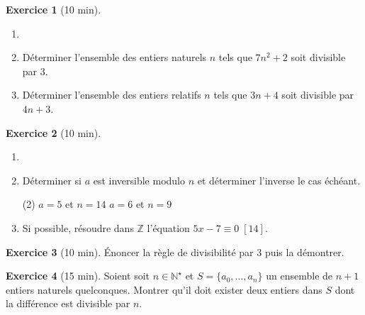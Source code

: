 \documentclass{exam}
\theoremstyle{definition}
\newtheorem{exercice}{Exercice}
\begin{document}
    \large





    \begin{exercice}[10 min]
        \begin{enumerate}
            \item[]
            \item Déterminer l’ensemble des entiers naturels $n$ tels que $7n^2 + 2$ soit divisible par $3$.
            \item Déterminer l’ensemble des entiers relatifs $n$ tels que $3n + 4$ soit divisible par $4n + 3$.
        \end{enumerate}
    \end{exercice}
    
    \begin{exercice}[10 min]
        \begin{enumerate}
            \item[]
            \item Déterminer si $a$ est inversible modulo $n$ et déterminer l’inverse le cas échéant.
            \begin{tasks}(2)
                \task $a = 5$ et $n = 14$
                \task $a = 6$ et $n = 9$
            \end{tasks}
            \item Si possible, résoudre dans $\mathbb{Z}$ l'équation $5x -7 \equiv 0 \; [14]$.
        \end{enumerate}
    \end{exercice}
    
    \begin{exercice}[10 min]
        Énoncer la règle de divisibilité par $3$ puis la démontrer.
    \end{exercice}

    \begin{exercice}[15 min]
        Soient soit $n \in \mathbb{N}^\star$ et $S = \{a_0, \dots, a_n\}$ un ensemble de $n+1$ entiers naturels quelconques.
        Montrer qu'il doit exister deux entiers dans $S$ dont la différence est divisible par $n$.
    \end{exercice}
    
\end{document}
